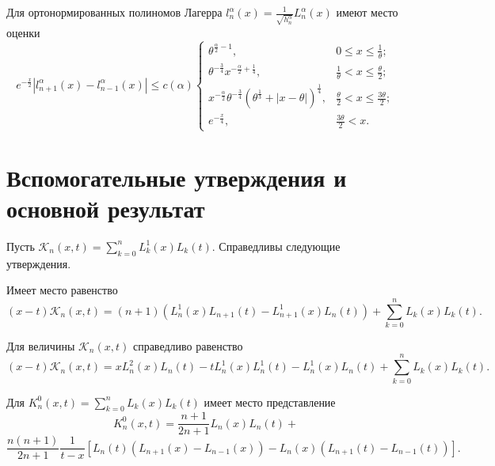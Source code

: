 Для ортонормированных полиномов Лагерра $l_n^\alpha(x)=\frac{1}{\sqrt{h_n^\alpha}}L_n^\alpha(x)$ имеют место оценки
\begin{equation*}\label{Gadzhimirzaev:orth-est}
e^{-\frac{x}{2}}|l_{n+1}^\alpha(x)-l_{n-1}^\alpha(x)|\le c(\alpha)
\begin{cases}
		\theta^{\frac{\alpha}{2}-1}, & 0\le x\le \frac{1}{\theta}; \\
		\theta^{-\frac34}x^{-\frac{\alpha}{2}+\frac14}, & \frac{1}{\theta}< x\le \frac{\theta}{2}; \\
		x^{-\frac{\alpha}{2}}\theta^{-\frac34}\left(\theta^{\frac13}+|x-\theta|\right)^{\frac14}, & \frac{\theta}{2}< x\le \frac{3\theta}{2}; \\
		e^{-\frac x4}, & \frac{3\theta}{2}<x.
\end{cases}
\end{equation*}

\section{Вспомогательные утверждения и основной результат}

Пусть $\mathcal{K}_{n}(x,t)=\sum\limits_{k=0}^{n}L_k^1(x)L_k(t)$. Справедливы следующие утверждения.

\begin{lemma}
Имеет место равенство
\begin{equation*}\label{Gadzhimirzaev:ker}
(x-t)\mathcal{K}_{n}(x,t)=(n+1)\left(L^1_{n}(x)L_{n+1}(t)-L^1_{n+1}(x)L_{n}(t)\right)+\sum_{k=0}^{n}L_{k}(x)L_{k}(t).
\end{equation*}
\end{lemma}

\begin{lemma}
Для величины $\mathcal{K}_{n}(x,t)$ справедливо равенство
\begin{equation*}
(x-t)\mathcal{K}_{n}(x,t)=xL^2_{n}(x)L_{n}(t)-tL^1_{n}(x)L^1_{n}(t)-L^1_{n}(x)L_{n}(t)+\sum_{k=0}^{n}L_{k}(x)L_{k}(t).
\end{equation*}
\end{lemma}

\begin{lemma}
Для $K_{n}^0(x,t)=\sum\limits_{k=0}^{n}L_{k}(x)L_{k}(t)$ имеет место представление
$$
K_n^0(x,t)=\frac{n+1}{2n+1}L_{n}(x)L_{n}(t)+
$$
\begin{equation*}	
\frac{n(n+1)}{2n+1}\frac{1}{t-x}\left[L_{n}(t)\left(L_{n+1}(x)-L_{n-1}(x)\right)-L_{n}(x)\left(L_{n+1}(t)-L_{n-1}(t)\right)\right].
\end{equation*}
\end{lemma}

